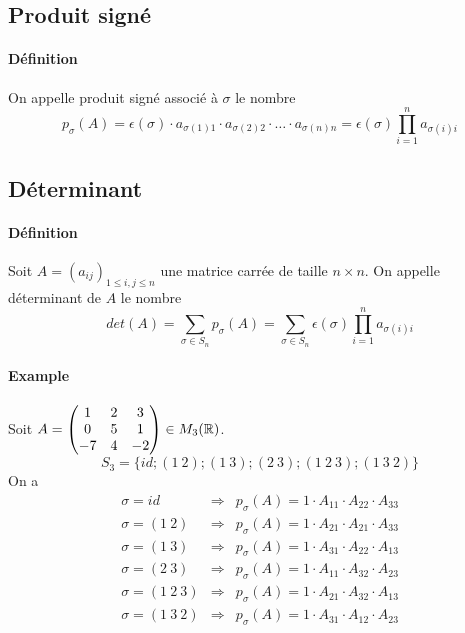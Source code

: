 \subsection{Produit signé}
%
\paragraph{Définition} On appelle produit signé associé à $\sigma$ le nombre 
$$p_{\sigma}(A) = \epsilon(\sigma) \cdot a_{\sigma(1) 1} \cdot a_{\sigma(2) 2} \cdot \ldots \cdot a_{\sigma(n) n} = \epsilon(\sigma) \prod_{i=1}^{n} a_{\sigma(i) i}$$

%
\subsection{Déterminant}
%
\paragraph{Définition} Soit $A = (a_{ij})_{1 \leq i, j \leq n}$ une matrice carrée de taille $n \times n$. On appelle déterminant de $A$ le nombre
$$det(A) = \sum_{\sigma \in S_n} p_{\sigma}(A) = \sum_{\sigma \in S_n} \epsilon(\sigma) \prod_{i=1}^{n} a_{\sigma(i) i}$$

\paragraph{Example} Soit $A = \begin{pmatrix} 1 & 2 & 3 \\ 0 & 5 & 1 \\ -7 & 4 & -2 \end{pmatrix} \in M_{3}(\mathbb{R})$.
$$S_3 = \{id; (1 ~ 2); (1 ~ 3); (2 ~ 3); (1 ~ 2 ~ 3); (1 ~ 3 ~ 2)\}$$
On a 
\begin{eqnarray*}
  \sigma = id           &\Rightarrow& p_{\sigma}(A) = 1 \cdot A_{11} \cdot A_{22} \cdot A_{33} \\
  \sigma = (1 ~ 2)      &\Rightarrow& p_{\sigma}(A) = 1 \cdot A_{21} \cdot A_{21} \cdot A_{33} \\
  \sigma = (1 ~ 3)      &\Rightarrow& p_{\sigma}(A) = 1 \cdot A_{31} \cdot A_{22} \cdot A_{13} \\
  \sigma = (2 ~ 3)      &\Rightarrow& p_{\sigma}(A) = 1 \cdot A_{11} \cdot A_{32} \cdot A_{23} \\
  \sigma = (1 ~ 2 ~ 3)  &\Rightarrow& p_{\sigma}(A) = 1 \cdot A_{21} \cdot A_{32} \cdot A_{13} \\
  \sigma = (1 ~ 3 ~ 2)  &\Rightarrow& p_{\sigma}(A) = 1 \cdot A_{31} \cdot A_{12} \cdot A_{23}
\end{eqnarray*}

